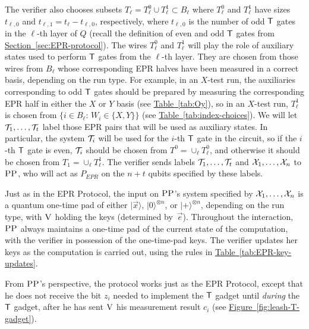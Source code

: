 \documentclass[11pt]{article}
\numberwithin{equation}{section}
\theoremstyle{definition}
\theoremstyle{plain}
\newcommand{\expref}[2]{\hyperref[#2]{#1~\ref{#2}}}
\newcommand{\ket}[1]{|#1\rangle}
\newcommand{\ver}{\textsc{V}}
\newcommand{\pp}{\textsc{PP}}
\begin{document}
The verifier also chooses subsets
$T_\ell = T_\ell^0 \cup T_\ell^1 \subset B_\ell$ 
%
%
%
%
where $T_\ell^0$ and $T_\ell^1$ have %
sizes $t_{\ell,0}$ and $t_{\ell,1} = t_\ell-t_{\ell,0}$, respectively,
where $t_{\ell,0}$ is the number of odd $\sf T$ gates in the $\ell$-th layer of $Q$ (recall the definition of even and odd $\sf T$ gates from \expref{Section}{sec:EPR-protocol}). The wires $T^0_\ell$ and $T^1_\ell$ will play the role of auxiliary states used to perform $\sf T$ gates from the $\ell$-th layer. They are chosen from those wires from $B_\ell$ whose corresponding EPR halves have been measured in a correct basis, depending on the run type.  For example, in an $X$-test run, the auxiliaries corresponding to odd $\sf T$ gates should be prepared by measuring the corresponding EPR half in either the $X$ or $Y$ basis (see \expref{Table}{tab:Oy}), so in an $X$-test run, $T_\ell^1$ is chosen from $\{i\in B_\ell:\,W_i\in \{X,Y\}\}$ (see \expref{Table}{tab:index-choices}). We will let ${\cal T}_1,\dots,{\cal T}_t$ label those EPR pairs that will be used as auxiliary states. In particular, the system ${\cal T}_i$ will be used for the $i$-th $\sf T$ gate in the circuit, so if the $i$-th $\sf T$ gate is even, ${\cal T}_i$ should be chosen from $T^0=\cup_\ell T_\ell^0$, and otherwise it should be chosen from $T_1=\cup_\ell T_\ell^1$. The verifier sends labels ${\cal T}_1,\dots,{\cal T}_t$ and ${\cal X}_1,\dots,{\cal X}_n$ to $\pp$, who will act as $P_{EPR}$ on the $n+t$ qubits specified by these labels.


Just as in the EPR Protocol, the input on $\pp$'s system specified by ${\cal X}_1,\dots,{\cal X}_n$ is a quantum one-time pad of either $\ket{\vec{x}}$, $\ket{0}^{\otimes n}$, or $\ket{+}^{\otimes n}$, depending on the run type, with $\ver$ holding the keys (determined by~$\vec{e}$). Throughout the interaction, $\pp$ always maintains a one-time pad of the current state of the computation, with the verifier in possession of the one-time-pad keys. The verifier updates her keys as the computation is carried out, using the rules in \expref{Table}{tab:EPR-key-updates}. 




From $\pp$'s perspective, the protocol works just as the EPR Protocol, except that he does not receive the bit $z_i$ needed to implement the $\sf T$ gadget until \emph{during} the $\sf T$ gadget, after he has sent $\ver$ his measurement result $c_i$ (see \expref{Figure}{fig:leash-T-gadget}).


 
\end{document}
